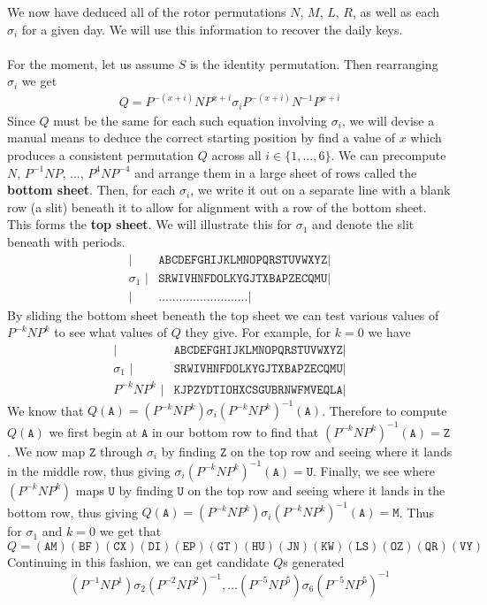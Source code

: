 We now have deduced all of the rotor permutations $N$, $M$, $L$, $R$,
as well as each
$\sigma_i$ for a given day. We will use this information to recover
the daily keys.
\\\\For the moment, let us assume $S$ is the identity permutation. Then
rearranging $\sigma_i$ we get
\begin{align}
  Q = P^{-(x+i)}NP^{x+i}\sigma_iP^{-(x+i)}N^{-1}P^{x+i} \label{eq:q_eq}
\end{align}
Since $Q$ must be the same for each such equation involving
$\sigma_i$, we will devise a manual means to deduce the correct
starting position by find a value of $x$ which produces a consistent
permutation $Q$ across all $i\in\{1,\dots,6\}$. We can
precompute $N$, $P^{-1}NP$, $\dots$, $P^{4}NP^{-4}$ and arrange them
in a large sheet of rows called the {\bf{bottom sheet}}. Then, for
each $\sigma_i$, we write it out on a separate line with a blank row
(a slit) beneath it to allow for alignment with a row of the bottom
sheet. This forms the \textbf{top sheet}. We will
illustrate this for $\sigma_1$ and denote the slit beneath with periods.
\begin{align*}
  \texttt{|}          & \texttt{ABCDEFGHIJKLMNOPQRSTUVWXYZ} \texttt{|} \\
  \sigma_1\texttt{ |} & \texttt{SRWIVHNFDOLKYGJTXBAPZECQMU} \texttt{|} \\
  \texttt{|}          & \texttt{..........................} \texttt{|}
\end{align*}
By sliding the bottom sheet
beneath the top sheet we can test various values of $P^{-k}NP^{k}$ to
see what values of $Q$ they give. For example, for $k = 0$ we have
\begin{align*}
  \texttt{|}          & \texttt{ABCDEFGHIJKLMNOPQRSTUVWXYZ} \texttt{|} \\
  \sigma_1\texttt{ |} & \texttt{SRWIVHNFDOLKYGJTXBAPZECQMU} \texttt{|} \\
  P^{-k}NP^{k} \texttt{ |}       &
  \texttt{KJPZYDTIOHXCSGUBRNWFMVEQLA} \texttt{|}
\end{align*}
We know that $Q(\texttt{A}) =
(P^{-k}NP^k)\sigma_i(P^{-k}NP^k)^{-1}(\texttt{A})$. Therefore to compute
$Q(\texttt{A})$ we first begin at $\texttt{A}$ in our bottom row to
find that $(P^{-k}NP^k)^{-1}(\texttt{A})=\texttt{Z}$. We now map $\texttt{Z}$
through $\sigma_i$ by finding $\texttt{Z}$ on the top row and seeing
where it lands in the middle row, thus giving
$\sigma_i(P^{-k}NP^k)^{-1}(\texttt{A}) = \texttt{U}$. Finally, we see
where $(P^{-k}NP^k)$
maps $\texttt{U}$ by finding $\texttt{U}$ on the top row and seeing
where it lands in the bottom row, thus giving $Q(\texttt{A}) =
(P^{-k}NP^k)\sigma_i(P^{-k}NP^k)^{-1}(\texttt{A}) = \texttt{M}$. Thus
for $\sigma_1$ and $k=0$ we get that
\[
  Q =
  (\texttt{AM})(\texttt{BF})(\texttt{CX})(\texttt{DI})(\texttt{EP})(\texttt{GT})(\texttt{HU})(\texttt{JN})(\texttt{KW})(\texttt{LS})(\texttt{OZ})(\texttt{QR})(\texttt{VY})
\]
Continuing in this fashion, we can
get candidate $Q$s generated
\[(P^{-1}NP^1)\sigma_2(P^{-2}NP^2)^{-1}, \dots
  (P^{-5}NP^5)\sigma_6(P^{-5}NP^5)^{-1}
\]
